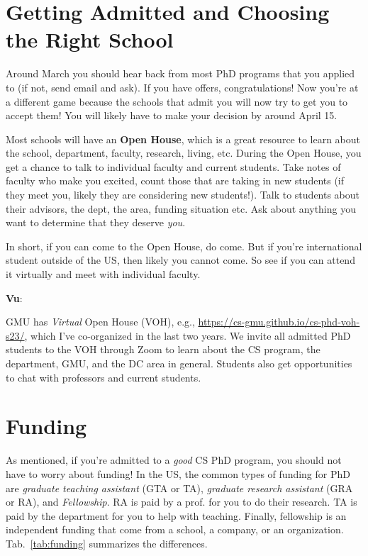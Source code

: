 \documentclass[11pt]{article}
\newenvironment{commentbox}[1][]{
\small
    \begin{cbox}
    \textbf{#1}: 
 }{
   \end{cbox}
}
\begin{document}
\section{Getting Admitted and Choosing the Right School}

Around March you should hear back from most PhD programs that you applied to (if not, send email and ask).
If you have offers, congratulations!  Now you're at a different game because the schools that admit you will now try to get you to accept them!   You will likely have to make your decision by around April 15.

Most schools will have an \textbf{Open House}, which is a great resource to learn about the school, department, faculty, research, living, etc. During the Open House, you get a chance to talk to individual faculty and current students.  Take notes of faculty who make you excited, count those that are taking in new students (if they meet you, likely they are considering new students!).  Talk to students about their advisors, the dept, the area, funding situation etc.  Ask about anything you want to determine that they deserve \emph{you}.

In short, if you can come to the Open House, do come.  But if you're international student outside of the US, then likely you cannot come.  So see if you can attend it virtually and meet with individual faculty.

\begin{commentbox}[Vu]
GMU has \emph{Virtual} Open House (VOH), e.g., \url{https://cs-gmu.github.io/cs-phd-voh-s23/}, which I've co-organized in the last two years. We invite all admitted PhD students to the VOH through Zoom to learn about the CS program, the department, GMU, and the DC area in general. Students also get opportunities to chat with professors and current students.
\end{commentbox}



\section{Funding}\label{sec:funding}

As mentioned, if you're admitted to a \emph{good} CS PhD program, you should not have to worry about funding!  
In the US, the common types of funding for PhD are \emph{graduate teaching assistant} (GTA or TA), \emph{graduate research assistant} (GRA or RA), and \emph{Fellowship}.
RA is paid by a prof. for you to do their research. TA is paid by the department for you to help with teaching. Finally, fellowship is an independent funding that come from a school, a company, or an organization. Tab.~\ref{tab:funding} summarizes the differences.
\end{document}
